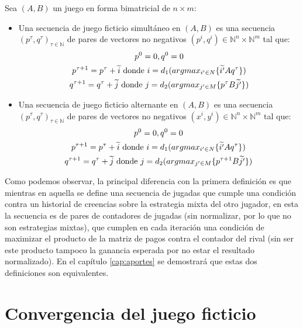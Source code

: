 \begin{definition} \label{def:fp:brandt}
    Sea $(A, B)$ un juego en forma bimatricial de $n \times m$:
    \begin{itemize}
        \item Una secuencia de juego ficticio simultáneo en $(A, B)$ es una secuencia $(p^\tau, q^\tau)_{\tau \in \mathbb{N}}$ de pares de vectores no negativos $(p^i, q^i) \in \mathbb{N}^n \times \mathbb{N}^m$ tal que:
        \begin{gather*}
            p^0 = \boldmath{0}, q^0 = \boldmath{0} \\
            p^{\tau+1} = p^{\tau} + \widetilde{i} \text{\ donde $i = d_1(argmax_{i' \in N}\{\widetilde{i'}Aq^\tau\})$} \\
            q^{\tau+1} = q^{\tau} + \widetilde{j} \text{\ donde $j = d_2(argmax_{j' \in M}\{p^{\tau}B\widetilde{j'}\})$}
        \end{gather*}
        \item Una secuencia de juego ficticio alternante en $(A, B)$ es una secuencia $(p^\tau, q^\tau)_{\tau \in \mathbb{N}}$  de pares de vectores no negativos $(x^i, y^i) \in \mathbb{N}^n \times \mathbb{N}^m$ tal que:
        \begin{gather*}
            p^0 = \boldmath{0}, q^0 = \boldmath{0} \\
            p^{\tau+1} = p^{\tau} + \widetilde{i} \text{\ donde $i = d_1(argmax_{i' \in N}\{\widetilde{i'}Aq^\tau\})$} \\
            q^{\tau+1} = q^{\tau} + \widetilde{j} \text{\ donde $j = d_2(argmax_{j' \in M}\{p^{\tau+1}B\widetilde{j'}\})$}
        \end{gather*}
    \end{itemize}
\end{definition}

Como podemos observar, la principal diferencia con la primera definición es que mientras en aquella se define una secuencia de jugadas que cumple una condición contra un historial de creencias sobre la estrategia mixta del otro jugador, en esta la secuencia es de pares de contadores de jugadas (sin normalizar, por lo que no son estrategias mixtas), que cumplen en cada iteración una condición de maximizar el producto de la matriz de pagos contra el contador del rival (sin ser este producto tampoco la ganancia esperada por no estar el resultado normalizado). En el capítulo \ref{cap:aportes} se demostrará que estas dos definiciones son equivalentes.

\section{Convergencia del juego ficticio}


